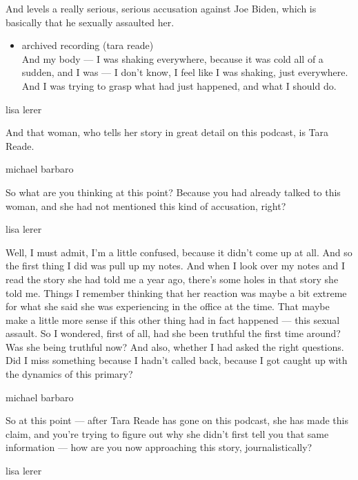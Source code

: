 And levels a really serious, serious accusation against Joe Biden, which
is basically that he sexually assaulted her.

\begin{itemize}
\tightlist
\item
  archived recording (tara reade)\\
  And my body --- I was shaking everywhere, because it was cold all of a
  sudden, and I was --- I don't know, I feel like I was shaking, just
  everywhere. And I was trying to grasp what had just happened, and what
  I should do.
\end{itemize}

lisa lerer

And that woman, who tells her story in great detail on this podcast, is
Tara Reade.

michael barbaro

So what are you thinking at this point? Because you had already talked
to this woman, and she had not mentioned this kind of accusation, right?

lisa lerer

Well, I must admit, I'm a little confused, because it didn't come up at
all. And so the first thing I did was pull up my notes. And when I look
over my notes and I read the story she had told me a year ago, there's
some holes in that story she told me. Things I remember thinking that
her reaction was maybe a bit extreme for what she said she was
experiencing in the office at the time. That maybe make a little more
sense if this other thing had in fact happened --- this sexual assault.
So I wondered, first of all, had she been truthful the first time
around? Was she being truthful now? And also, whether I had asked the
right questions. Did I miss something because I hadn't called back,
because I got caught up with the dynamics of this primary?

michael barbaro

So at this point --- after Tara Reade has gone on this podcast, she has
made this claim, and you're trying to figure out why she didn't first
tell you that same information --- how are you now approaching this
story, journalistically?

lisa lerer

